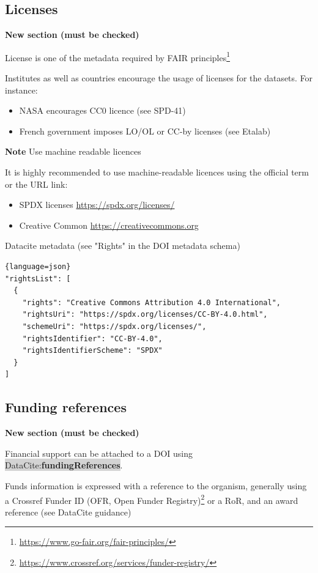 \documentclass[11pt,a4paper]{ivoa}
\newcommand{\dataciteterm}[1]{\colorbox{lightgray}{DataCite:\textbf{#1}}}
\newcommand{\important}[1]{
	\begin{bigdescription}
		\item \color{ivoacolor}\textbf{Note} #1
	\end{bigdescription}
}
\begin{document}
\subsection{Licenses}
\label{sec:licenses}
\textbf{\color{red}New section (must be checked)}

License is one of the metadata required by FAIR principles\footnote{\url{https://www.go-fair.org/fair-principles/}}

Institutes as well as countries encourage the usage of licenses for the datasets. For instance:
\begin{itemize}
\item NASA encourages CC0 licence (see SPD-41)
\item French government imposes LO/OL or CC-by licenses (see Etalab)
\end{itemize}


\important{Use machine readable licences}

It is highly recommended to use machine-readable licences using the official term or the URL link:

\begin{itemize}
\item SPDX licenses \url{https://spdx.org/licenses/}
\item Creative Common \url{https://creativecommons.org}
\end{itemize}

Datacite metadata (see "Rights" in the DOI metadata schema)

\begin{lstlisting}{language=json}
"rightsList": [
  {
    "rights": "Creative Commons Attribution 4.0 International",
    "rightsUri": "https://spdx.org/licenses/CC-BY-4.0.html",
    "schemeUri": "https://spdx.org/licenses/",
    "rightsIdentifier": "CC-BY-4.0",
    "rightsIdentifierScheme": "SPDX"
  }
]
\end{lstlisting}

\subsection{Funding references}
\textbf{\color{red}New section (must be checked)}

Financial support can be attached to a DOI using \dataciteterm{fundingReferences}.

Funds information is expressed with a reference to the organism, generally using a Crossref Funder ID (OFR, Open Funder Registry)\footnote{\url{https://www.crossref.org/services/funder-registry/}} or a RoR, and an award reference (see DataCite guidance)
\end{document}
